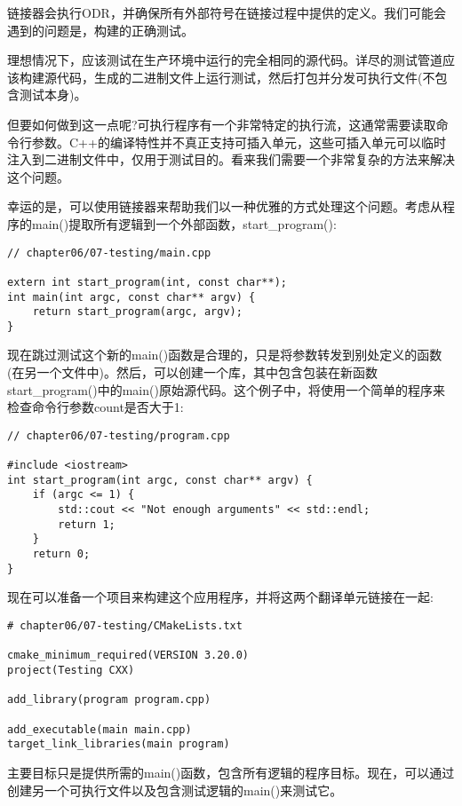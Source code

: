 链接器会执行ODR，并确保所有外部符号在链接过程中提供的定义。我们可能会遇到的问题是，构建的正确测试。

理想情况下，应该测试在生产环境中运行的完全相同的源代码。详尽的测试管道应该构建源代码，生成的二进制文件上运行测试，然后打包并分发可执行文件(不包含测试本身)。

但要如何做到这一点呢?可执行程序有一个非常特定的执行流，这通常需要读取命令行参数。C++的编译特性并不真正支持可插入单元，这些可插入单元可以临时注入到二进制文件中，仅用于测试目的。看来我们需要一个非常复杂的方法来解决这个问题。

幸运的是，可以使用链接器来帮助我们以一种优雅的方式处理这个问题。考虑从程序的main()提取所有逻辑到一个外部函数，start\_program():

\begin{lstlisting}[style=styleCXX]
// chapter06/07-testing/main.cpp

extern int start_program(int, const char**);
int main(int argc, const char** argv) {
	return start_program(argc, argv);
}
\end{lstlisting}

现在跳过测试这个新的main()函数是合理的，只是将参数转发到别处定义的函数(在另一个文件中)。然后，可以创建一个库，其中包含包装在新函数start\_program()中的main()原始源代码。这个例子中，将使用一个简单的程序来检查命令行参数count是否大于1:

\begin{lstlisting}[style=styleCXX]
// chapter06/07-testing/program.cpp

#include <iostream>
int start_program(int argc, const char** argv) {
	if (argc <= 1) {
		std::cout << "Not enough arguments" << std::endl;
		return 1;
	}
	return 0;
}
\end{lstlisting}

现在可以准备一个项目来构建这个应用程序，并将这两个翻译单元链接在一起:

\begin{lstlisting}[style=styleCMake]
# chapter06/07-testing/CMakeLists.txt

cmake_minimum_required(VERSION 3.20.0)
project(Testing CXX)

add_library(program program.cpp)

add_executable(main main.cpp)
target_link_libraries(main program)
\end{lstlisting}

主要目标只是提供所需的main()函数，包含所有逻辑的程序目标。现在，可以通过创建另一个可执行文件以及包含测试逻辑的main()来测试它。

